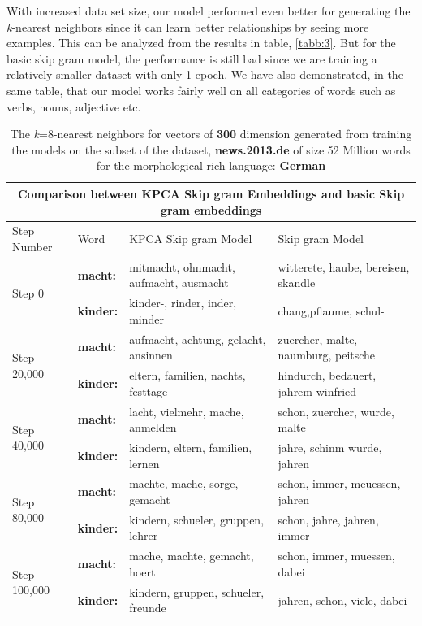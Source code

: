 With increased data set size, our model performed even better for generating the \textit{k}-nearest neighbors since it can learn better relationships by seeing more examples. This can be analyzed from the results in table, \ref{tabb:3}. 
But for the basic skip gram model, the performance is still bad since we are training a relatively smaller dataset with only 1 epoch. We have also demonstrated, in the same table, that our model works fairly well on all categories of words such as verbs, nouns, adjective etc.
\begin{table}[H]
	\hskip-2.0cm
	\begin{tabular}[htbp]{|l|l|l|l|}	
		\hline
		\multicolumn{4}{|c|}{\textbf{Comparison between KPCA Skip gram Embeddings and basic Skip gram embeddings}} \\
		\hline
		Step Number&Word &KPCA Skip gram Model & Skip gram Model\\ \hline
		\multirow{2}{*}{Step 0} &\textbf{macht:}&mitmacht, ohnmacht, aufmacht, ausmacht& witterete, haube, bereisen, skandle\\
		&\textbf{kinder:}&kinder-, rinder, inder, minder &chang,pflaume, schul-\\ 
		\hline
		\multirow{2}{*}{Step 20,000} & \textbf{macht:}&aufmacht, achtung, gelacht, ansinnen&zuercher, malte, naumburg, peitsche \\
		& \textbf{kinder:}&eltern, familien, nachts, festtage& hindurch, bedauert, jahrem winfried \\
		\hline
		\multirow{2}{*}{Step 40,000} &\textbf{macht:}&lacht, vielmehr, mache, anmelden& schon, zuercher, wurde, malte\\
		& \textbf{kinder:}&kindern, eltern, familien, lernen& jahre, schinm wurde, jahren\\
		\hline
		\multirow{2}{*}{Step 80,000} &\textbf{macht:}&machte, mache, sorge, gemacht& schon, immer, meuessen, jahren\\
		& \textbf{kinder:}&kindern, schueler, gruppen, lehrer& schon, jahre, jahren, immer\\
		\hline
		\multirow{2}{*}{Step 100,000} & \textbf{macht:}&mache, machte, gemacht, hoert& schon, immer, muessen, dabei \\
		& \textbf{kinder:}&kindern, gruppen, schueler, freunde& jahren, schon, viele, dabei \\
		\hline
	\end{tabular}
	\caption{The \textit{k}=8-nearest neighbors for vectors of \textbf{300} dimension generated from training the models on the subset of the dataset, \textbf{news.2013.de} of size 52 Million words for the morphological rich language: \textbf{German}} \label{x_:2}
\end{table}

